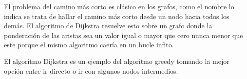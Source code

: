 El problema del camino más corto es clásico en los grafos, como el nombre lo indica se trata de
 hallar el camino más corto desde un nodo hacia todos los demás. El algoritmo de Dijkstra resuelve esto sobre un grafo donde la ponderación de las aristas sea un valor igual o mayor que cero nunca menor que este porque el mismo algoritmo caería en un bucle infito.

El algoritmo Dijkstra es un ejemplo del algoritmo greedy tomando la mejor opción entre ir
directo o ir con algunos nodos intermedios.